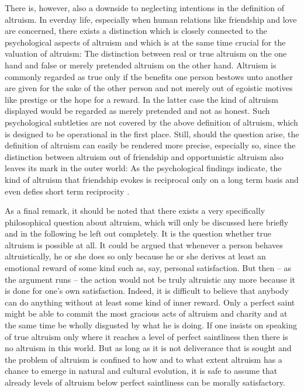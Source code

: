 There is, however, also a downside to neglecting intentions in the definition
of altruism. In everday life, especially when human relations like friendship
and love are concerned, there exists a distinction which is closely connected
to the psychological aspects of altruism and which is at the same time crucial
for the valuation of altruism: The distinction between real or true altruism
on the one hand and false or merely pretended altruism on the other hand.
Altruism is commonly regarded as true only if the benefits one person bestows
unto another are given for the sake of the other person and not merely out of
egoistic motives like prestige or the hope for a reward. In the latter case
the kind of altruism displayed would be regarded as merely pretended and not as
honest. Such psychological subtleties are not covered by the above definition
of altruism, which is designed to be operational in the first place. Still,
should the question arise, the definition of altruism can easily be rendered
more precise, especially so, since the distinction between altruism out of
friendship and opportunistic altruism also leaves its mark in the outer world:
As the psychological findings indicate, the kind of altruism that friendship
evokes is reciprocal only on a long term basis and even defies short term
reciprocity \cite[]{silk:2003}.

As a final remark, it should be noted that there exists a very specifically
philosophical question about altruism, which will only be discussed here
briefly and in the following be left out completely. It is the question
whether true altruism is possible at all. It could be argued that whenever a
person behaves altruistically, he or she does so only because he or she
derives at least an emotional reward of some kind such as, say, personal
satisfaction. But then -- as the argument runs -- the action would not be
truly altruistic any more because it is done for one's own satisfaction.
Indeed, it is difficult to believe that anybody can do anything without at
least some kind of inner reward.  Only a perfect saint might be able to commit
the most gracious acts of altruism and charity and at the same time be wholly
disgusted by what he is doing. If one insists on speaking of true altruism
only where it reaches a level of perfect saintliness then there is no altruism
in this world.  But as long as it is not deliverance that is sought and the
problem of altruism is confined to how and to what extent altruism has a
chance to emerge in natural and cultural evolution, it is safe to assume that
already levels of altruism below perfect saintliness can be morally
satisfactory.
